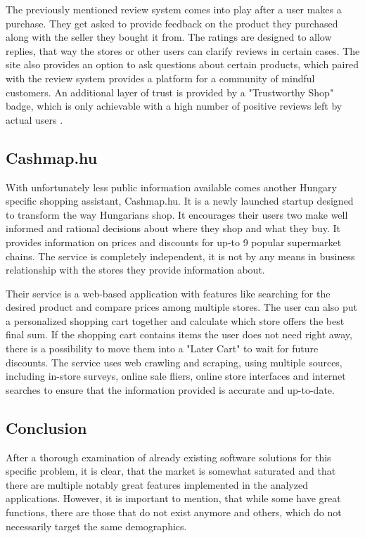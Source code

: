 The previously mentioned review system comes into play after a user makes a purchase. They get asked to provide feedback on the product they purchased along with the seller they bought it from. The ratings are designed to allow replies, that way the stores or other users can clarify reviews in certain cases. The site also provides an option to ask questions about certain products, which paired with the review system provides a platform for a community of mindful customers. An additional layer of trust is provided by a "Trustworthy Shop" badge, which is only achievable with a high number of positive reviews left by actual users \cite{arukereso}. 

\subsection{Cashmap.hu}

With unfortunately less public information available comes another Hungary specific shopping assistant, Cashmap.hu. It is a newly launched startup designed to transform the way Hungarians shop. It encourages their users two make well informed and rational decisions about where they shop and what they buy. It provides information on prices and discounts for up-to 9 popular supermarket chains. The service is completely independent, it is not by any means in business relationship with the stores they provide information about. \cite{maradokapenzemnel2021}

Their service is a web-based application with features like searching for the desired product and compare prices among multiple stores. The user can also put a personalized shopping cart together and calculate which store offers the best final sum. If the shopping cart contains items the user does not need right away, there is a possibility to move them into a "Later Cart" to wait for future discounts. The service uses web crawling and scraping, using multiple sources, including in-store surveys, online sale fliers, online store interfaces and internet searches to ensure that the information provided is accurate and up-to-date. \cite{maradokapenzemnel2021}

\subsection{Conclusion}

After a thorough examination of already existing software solutions for this specific problem, it is clear, that the market is somewhat saturated and that there are multiple notably great features implemented in the analyzed applications. However, it is important to mention, that while some have great functions, there are those that do not exist anymore and others, which do not necessarily target the same demographics. 

